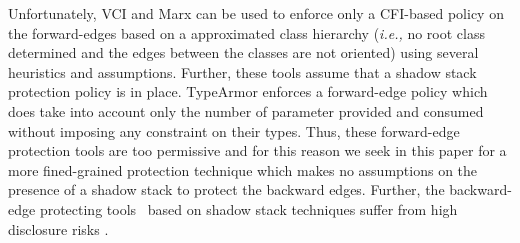 
Unfortunately, VCI and Marx can be used to enforce only a CFI-based policy on the forward-edges based on a approximated class hierarchy  
(\textit{i.e.,} no root class determined and the edges between the classes are not oriented) using several heuristics and assumptions. Further, these tools assume
that a shadow stack protection policy is in place. TypeArmor enforces a forward-edge policy which does take into account only the number of parameter 
provided and consumed without imposing any constraint on their types. Thus, these forward-edge protection tools are too permissive and for this reason we seek 
in this paper for a more fined-grained protection technique which makes no assumptions on the presence of a shadow stack to protect the backward edges.
Further, the backward-edge protecting tools~\cite{} based on shadow stack techniques suffer from high disclosure risks \cite{safestack:bypassing}.

